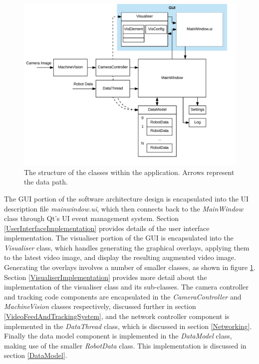 \begin{figure}
	\centering
	\includegraphics[scale=0.8]{Figures/ApplicationStructure.png}
	\decoRule
	\caption[Application Structure]{The structure of the classes within the application. Arrows represent the data path.}
	\label{fig:ApplicationStructure}
\end{figure}

The GUI portion of the software architecture design is encapsulated into the UI description file \textit{mainwindow.ui}, which then connects back to the \textit{MainWindow} class through Qt's UI event management system. Section \ref{UserInterfaceImplementation} provides details of the user interface implementation. The visualiser portion of the GUI is encapsulated into the \textit{Visualiser} class, which handles generating the graphical overlays, applying them to the latest video image, and display the resulting augmented video image. Generating the overlays involves a number of smaller classes, as shown in figure \ref{fig:ApplicationStructure}. Section \ref{VisualiserImplementation} provides more detail about the implementation of the visualiser class and its sub-classes. The camera controller and tracking code components are encapsulated in the \textit{CameraController} and \textit{MachineVision} classes respectively, discussed further in section \ref{VideoFeedAndTrackingSystem}, and the network controller component is implemented in the \textit{DataThread} class, which is discussed in section \ref{Networking}. Finally the data model component is implemented in the \textit{DataModel} class, making use of the smaller \textit{RobotData} class. This implementation is discussed in section \ref{DataModel}.

